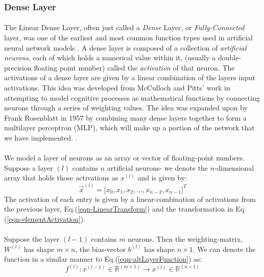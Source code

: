 \documentclass[12pt,letterpaper]{article}
\begin{document}

\subsubsection{Dense Layer}
\label{subsubsec-DenseLayer}

\paragraph*{}The Linear Dense Layer, often just called a \textit{Dense} Layer, or \textit{Fully-Connected} layer, was one of the earliest and most common function types used in artificial neural network models \cite{Geron2,Loy,McCulloch}. A dense layer is composed of a collection of \textit{artificial neurons}, each of which holds a numerical value within it, (usually a double-precision floating point number) called the \textit{activation} of that neuron. The activations of a dense layer are given by a linear combination of the layers input activations. This idea was developed from McCulloch and Pitts' work \cite{McCulloch} in attempting to model cognitive processes as mathematical functions by connecting neurons through a series of weighting values. The idea was expanded upon by Frank Rosenblatt in  1957 by combining many dense layers together to form a multilayer perceptron (MLP), which will make up a portion of the network that we have implemented. \cite{Geron,Loy,Levine}.

\paragraph*{}We model a layer of neurons as an array or vector of floating-point numbers. Suppose a layer $(l)$ contains $n$ artificial neurons- we denote the $n$-dimensional array that holds those activations as $x^{(l)}$ and is given by:
\begin{equation}
\label{layer-DenseNeurons}
\vec{x}^{(l)} = \Big[ x_0, x_1, x_2, \hdots , x_{n-2}, x_{n-1} \Big]^T
\end{equation}
The activation of each entry is given by a linear-combination of activations from the previous layer, Eq.(\ref{eqn-LinearTransform}) and the transformation in Eq.(\ref{eqn-elementActivation}).

\paragraph*{}Suppose the layer $(l-1)$ contains $m$ neurons. Then the weighting-matrix, $W^{(l)}$ has shape $m \times n$, the bias-vector $b^{(l)}$ has shape $n \times 1$. We can denote the function in a similar manner to Eq.(\ref{eqn-altLayerFunction}) as:
\begin{equation}
\label{eqn-FunctionDense}
f^{(l)} : x^{(l-1)} \in \mathbb{R}^{(m \times 1)} \rightarrow x^{(l)} \in \mathbb{R}^{(n \times 1)}
\end{equation}
\end{document}
